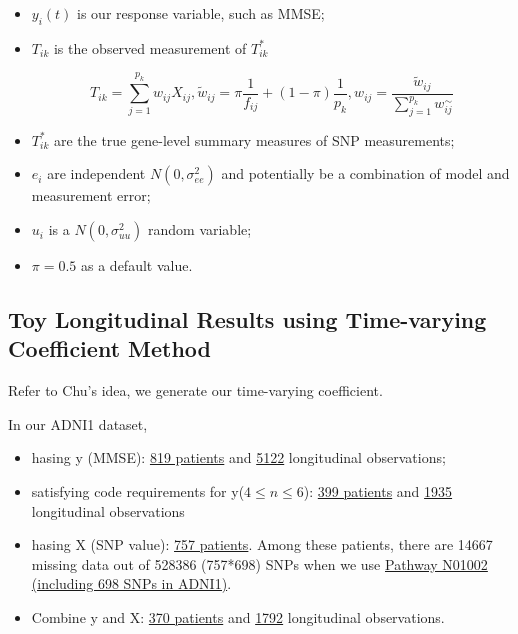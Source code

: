 \begin{itemize}
    
\item $y_{i}(t)$ is our response variable, such as MMSE;

\item $T_{ik}$ is the observed measurement of $T_{ik}^{*}$ 

\begin{equation}
T_{ik} = \sum_{j=1}^{p_{k}}w_{ij}X_{ij}, 
\tilde{w}_{ij} = \pi\frac{1}{f_{ij}} + (1 - \pi)\frac{1}{p_{k}}, 
w_{ij} = \frac
{\tilde{w}_{ij}}{\sum_{j=1}^{p_{k}}w_{ij}^{\sim}}
\end{equation}


\item $T_{ik}^{*}$ are the true gene-level summary measures of SNP measurements;
	
\item $e_i$ are independent $N(0, \sigma_{ee}^{2})$ and potentially be a combination of model and measurement error; 
	
\item $u_i$ is a $N(0, \sigma_{uu}^{2})$ random variable;
	
\item $\pi = 0.5$ as a default value.
\end{itemize}




\subsection{Toy Longitudinal Results using Time-varying Coefficient Method}

Refer to Chu's \citet{chu2016feature} idea, we generate our time-varying coefficient.



In our ADNI1 dataset, 

\begin{itemize}
    
\item hasing y (MMSE): 
\underline{819 patients} and \underline{5122} longitudinal observations;

\item satisfying code requirements for y($4 \leq n \leq 6$): 
\underline{399 patients} and \underline{1935} longitudinal observations


\item hasing X (SNP value): 
\underline{757 patients}. Among these patients, there are 14667 missing data out of 528386 (757*698) SNPs when we use \underline{Pathway N01002 (including 698 SNPs in ADNI1)}.


\item Combine y and X: 
\underline{370 patients} and \underline{1792} longitudinal observations.

\end{itemize}


